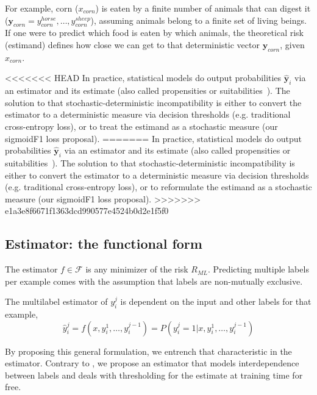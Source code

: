 For example, corn ($x_{corn}$) is eaten by a finite number of animals that can digest it ($\mathbf{y}_{corn} = {y_{corn}^{horse}, \ldots, y_{corn}^{sheep}} $), assuming animals belong to a finite set of living beings. If one were to predict which food is eaten by which animals, the theoretical risk (estimand) defines how close we can get to that deterministic vector $\mathbf{y}_{corn}$, given $x_{corn}$.
\fi

<<<<<<< HEAD
In practice, statistical models do output probabilities $\mathbf{\hat{y}}_{i}$ via an estimator and its estimate (also called propensities or suitabilities~\citep{multilabelReduction}). The solution to that stochastic-deterministic incompatibility is either to convert the estimator to a deterministic measure via decision thresholds (e.g. traditional cross-entropy loss), or to treat the estimand as a stochastic measure (our sigmoidF1 loss proposal).
=======
In practice, statistical models do output probabilities $\mathbf{\hat{y}}_{i}$ via an estimator and its estimate (also called propensities or suitabilities~\citep{multilabelReduction}). The solution to that stochastic-deterministic incompatibility is either to convert the estimator to a deterministic measure via decision thresholds (e.g. traditional cross-entropy loss), or to reformulate the estimand as a stochastic measure (our sigmoidF1 loss proposal). 
>>>>>>> e1a3e8f6671f1363dcd990577e4524b0d2e1f5f0

\subsection{Estimator: the functional form}
\label{section:background:estimator}

The estimator $f \in \mathcal{F}$ is any minimizer of the risk $R_{ML}$. Predicting multiple labels per example comes with the assumption that labels are non-mutually exclusive.

\vspace{-.5\baselineskip}
\begin{proposition}
  The multilabel estimator of $y_{i}^{j}$ is dependent on the input and other labels for that example,
%
\begin{equation}
  \hat{y}_i^j = f(x, y_{i}^{1}, \ldots, y_{i}^{j-1}) = P(y_i^j = 1 | x, y_{i}^{1}, \ldots, y_{i}^{j-1})
\end{equation}
\label{eq:estimator}
\end{proposition}
\vspace{-1.5\baselineskip}
%
 By proposing this general formulation, we entrench that characteristic in the estimator. Contrary to \citet{multilabelReduction}, we propose an estimator that models interdependence between labels and deals with thresholding for the estimate at training time for free.


